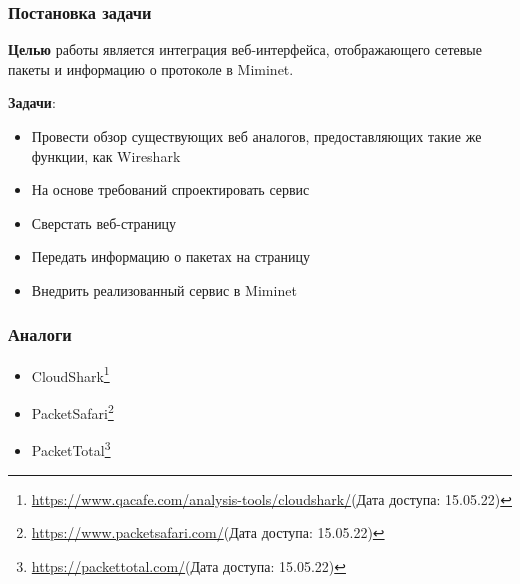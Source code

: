 \documentclass[aspectratio=169]{beamer}
\begin{document}
\begin{frame}
	\frametitle{Постановка задачи}
	\textbf{Целью} работы является интеграция веб-интерфейса, отображающего сетевые пакеты и информацию о протоколе в Miminet.  %

	\textbf{Задачи}:
	\begin{itemize}
		\item Провести обзор существующих веб аналогов, предоставляющих такие же функции, как Wireshark
		\item На основе требований спроектировать сервис
		\item Сверстать веб-страницу
		\item Передать информацию о пакетах на страницу
		\item Внедрить реализованный сервис в Miminet
	\end{itemize}
\end{frame}



\begin{frame}
	\frametitle{Аналоги}
	\begin{itemize}
		\item CloudShark\footnote{\url{https://www.qacafe.com/analysis-tools/cloudshark/}(Дата доступа: 15.05.22)}
		\item PacketSafari\footnote{\url{https://www.packetsafari.com/}(Дата доступа: 15.05.22)}
		\item PacketTotal\footnote{\url{https://packettotal.com/}(Дата доступа: 15.05.22)}

	\end{itemize}
\end{frame}
\end{document}
